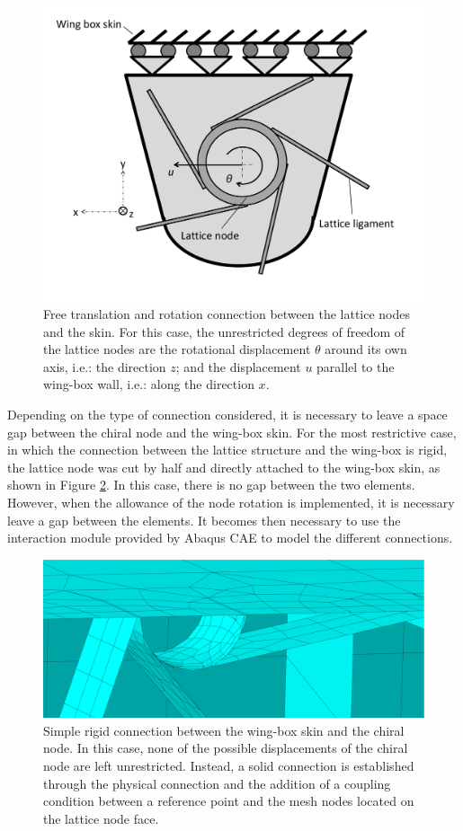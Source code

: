     \begin{figure}[!htpb]
      \centering
      \includegraphics[width=0.6 \textwidth]{figures/model/connectionModeling2}
      \caption[Free translation and rotation connection between the lattice nodes and the skin]{Free translation and rotation connection between the lattice nodes and the skin. For this case, the unrestricted degrees of freedom of the lattice nodes are the rotational displacement $\theta$ around its own axis, i.e.: the direction $z$; and the displacement $u$ parallel to the wing-box wall, i.e.: along the direction $x$.}\label{fig:connectionModeling2}
    \end{figure}

    Depending on the type of connection considered, it is necessary to leave a space gap between the chiral node and the wing-box skin. For the most restrictive case, in which the connection between the lattice structure and the wing-box is rigid, the lattice node was cut by half and directly attached to the wing-box skin, as shown in Figure \ref{fig:chiralNodeCut}. In this case, there is no gap between the two elements. However, when the allowance of the node rotation is implemented, it is necessary leave a gap between the elements. It becomes then necessary to use the interaction module provided by Abaqus CAE to model the different connections. %

    \begin{figure}[!htpb]
      \centering
      \includegraphics[width=0.8 \textwidth]{figures/../figures/model/chiralNodeCut}
      \caption[Simple rigid connection between the wing-box skin and the chiral node]{Simple rigid connection between the wing-box skin and the chiral node. In this case, none of the possible displacements of the chiral node are left unrestricted. Instead, a solid connection is established through the physical connection and the addition of a coupling condition between a reference point and the mesh nodes located on the lattice node face.}
      \label{fig:chiralNodeCut}
    \end{figure} 

